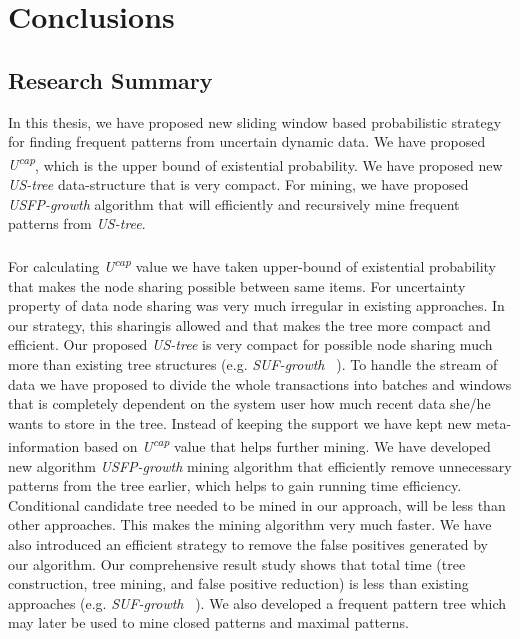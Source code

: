 \chapter{Conclusions}
\section{Research Summary}
In this thesis, we have proposed new sliding window based probabilistic strategy for finding frequent patterns from uncertain dynamic data. We have proposed \emph{U\textsuperscript{cap}}, which is the upper bound of existential probability. We have proposed new \emph{US-tree} data-structure that is very compact. For mining, we have proposed \emph{USFP-growth} algorithm that will efficiently and recursively mine frequent patterns from \emph{US-tree}.\\
\\
For calculating \emph{U\textsuperscript{cap}} value we have taken upper-bound of existential probability that makes the node sharing possible between same items. For uncertainty property of data node sharing was very much irregular in existing approaches. In our strategy, this sharingis allowed and that makes the tree more compact and efficient. Our proposed \emph{US-tree} is very compact for possible node sharing much more than existing tree structures (e.g. \emph{SUF-growth} ~\cite{suf_growth}). To handle the stream of data we have proposed to divide the whole transactions into batches and windows that is completely dependent on the system user how much recent data she/he wants to store in the tree. Instead of keeping the support we have kept new meta-information based on \emph{U\textsuperscript{cap}} value that helps further mining. We have developed new algorithm \emph{USFP-growth} mining algorithm that efficiently remove unnecessary patterns from the tree earlier, which helps to gain running time efficiency. Conditional candidate tree needed to be mined in our approach, will be less than other approaches. This makes the mining algorithm very much faster. We have also introduced an efficient strategy to remove the false positives generated by our algorithm. Our comprehensive result study shows that total time (tree construction, tree mining, and false positive reduction) is less than existing approaches (e.g. \emph{SUF-growth} ~\cite{suf_growth}). We also developed a frequent pattern tree which may later be used to mine closed patterns and maximal patterns.
